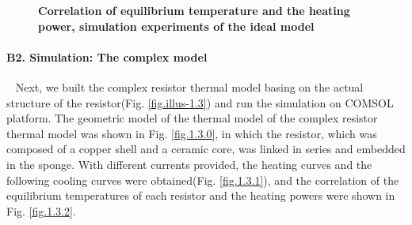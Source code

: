 \documentclass[10pt,a4paper,twocolumn,twoside,UTF8]{article}
\begin{document}
	\begin{figure}[htbp]
		\centering

		\caption{\textbf{Correlation of equilibrium temperature and the heating power, simulation experiments of the ideal model}}
		\label{fig.1.2.2}
	\end{figure}



	\paragraph{B2. Simulation: The complex model}~
	\newline 
	\indent
	Next, we built the complex resistor thermal model basing on the actual structure of the resistor(Fig. \ref{fig.illus-1.3}) and run the simulation on COMSOL platform.
	The geometric model of the thermal model of the complex resistor thermal model was shown in Fig. \ref{fig.1.3.0}, in which the resistor, 
	which was composed of a copper shell and a ceramic core, was linked in series and embedded in the sponge.
	With different currents provided, the heating curves and the following cooling curves were obtained(Fig. \ref{fig.1.3.1}),
	and the correlation of the equilibrium temperatures of each resistor and the heating powers were shown in Fig. \ref{fig.1.3.2}.
\end{document}
